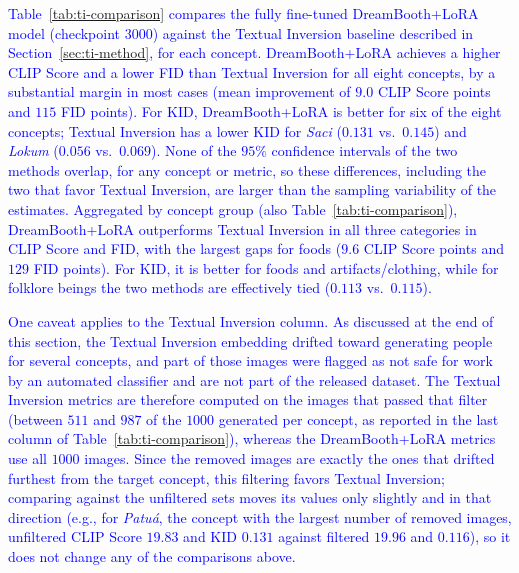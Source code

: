 \documentclass[pdflatex,sn-mathphys-num]{sn-jnl}%
\theoremstyle{thmstyleone}%
\theoremstyle{thmstyletwo}%
\theoremstyle{thmstylethree}%
\begin{document}
\textcolor{blue}{Table~\ref{tab:ti-comparison} compares the fully fine-tuned DreamBooth+LoRA model (checkpoint $3000$) against the Textual Inversion baseline described in Section~\ref{sec:ti-method}, for each concept. DreamBooth+LoRA achieves a higher CLIP Score and a lower FID than Textual Inversion for all eight concepts, by a substantial margin in most cases (mean improvement of $9.0$ CLIP Score points and $115$ FID points). For KID, DreamBooth+LoRA is better for six of the eight concepts; Textual Inversion has a lower KID for \textit{Saci} ($0.131$ vs.\ $0.145$) and \textit{Lokum} ($0.056$ vs.\ $0.069$). None of the $95\%$ confidence intervals of the two methods overlap, for any concept or metric, so these differences, including the two that favor Textual Inversion, are larger than the sampling variability of the estimates. Aggregated by concept group (also Table~\ref{tab:ti-comparison}), DreamBooth+LoRA outperforms Textual Inversion in all three categories in CLIP Score and FID, with the largest gaps for foods ($9.6$ CLIP Score points and $129$ FID points). For KID, it is better for foods and artifacts/clothing, while for folklore beings the two methods are effectively tied ($0.113$ vs.\ $0.115$).}

\textcolor{blue}{One caveat applies to the Textual Inversion column. As discussed at the end of this section, the Textual Inversion embedding drifted toward generating people for several concepts, and part of those images were flagged as not safe for work by an automated classifier and are not part of the released dataset. The Textual Inversion metrics are therefore computed on the images that passed that filter (between $511$ and $987$ of the $1000$ generated per concept, as reported in the last column of Table~\ref{tab:ti-comparison}), whereas the DreamBooth+LoRA metrics use all $1000$ images. Since the removed images are exactly the ones that drifted furthest from the target concept, this filtering favors Textual Inversion; comparing against the unfiltered sets moves its values only slightly and in that direction (e.g., for \textit{Patu\'a}, the concept with the largest number of removed images, unfiltered CLIP Score $19.83$ and KID $0.131$ against filtered $19.96$ and $0.116$), so it does not change any of the comparisons above.}
\end{document}
